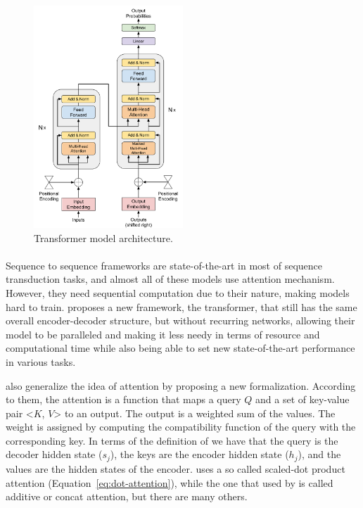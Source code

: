 \begin{figure}[h]
        \centering
        \includegraphics[width=0.5\textwidth]{images/Transformer.pdf}
        \caption{Transformer model architecture.}
        \label{fig:transformer}
\end{figure}

\paragraph{}
Sequence to sequence frameworks are state-of-the-art in most of sequence transduction tasks, and almost all of these models use attention mechanism. However, they need sequential computation due to their nature, making models hard to train. \citet{vaswani2017attention} proposes a new framework, the transformer, that still has the same overall encoder-decoder structure, but without recurring networks, allowing their model to be paralleled and making it less needy in terms of resource and computational time while also being able to set new state-of-the-art performance in various tasks.

\citet{vaswani2017attention} also generalize the idea of attention by proposing a new formalization. According to them, the attention is a function that maps a query $Q$ and a set of key-value pair <$K$, $V$> to an output. The output is a weighted sum of the values. The weight is assigned by computing the compatibility function of the query with the corresponding key. In terms of the definition of \citet{bahdanau2014neural} we have that the query is the decoder hidden state ($s_j$), the keys are the encoder hidden state ($h_j$), and the values are the hidden states of the encoder. \citet{vaswani2017attention} uses a so called scaled-dot product attention (Equation~\ref{eq:dot-attention}), while the one that used by \cite{bahdanau2014neural} is called additive or concat attention, but there are many others.

